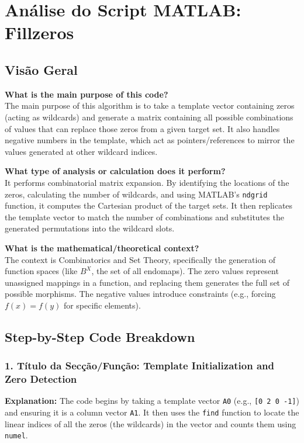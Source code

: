 \chapter{Análise do Script MATLAB: Fillzeros}
\section{Visão Geral}

\textbf{What is the main purpose of this code?} \\
The main purpose of this algorithm is to take a template vector containing zeros (acting as wildcards) and generate a matrix containing all possible combinations of values that can replace those zeros from a given target set. It also handles negative numbers in the template, which act as pointers/references to mirror the values generated at other wildcard indices.

\textbf{What type of analysis or calculation does it perform?} \\
It performs combinatorial matrix expansion. By identifying the locations of the zeros, calculating the number of wildcards, and using MATLAB's \texttt{ndgrid} function, it computes the Cartesian product of the target sets. It then replicates the template vector to match the number of combinations and substitutes the generated permutations into the wildcard slots. 

\textbf{What is the mathematical/theoretical context?} \\
The context is Combinatorics and Set Theory, specifically the generation of function spaces (like $B^X$, the set of all endomaps). The zero values represent unassigned mappings in a function, and replacing them generates the full set of possible morphisms. The negative values introduce constraints (e.g., forcing $f(x) = f(y)$ for specific elements).

\newpage
\section{Step-by-Step Code Breakdown}

\subsection{1. Título da Secção/Função: Template Initialization and Zero Detection}
\textbf{Explanation:} 
The code begins by taking a template vector \texttt{A0} (e.g., \texttt{[0 2 0 -1]}) and ensuring it is a column vector \texttt{A1}. It then uses the \texttt{find} function to locate the linear indices of all the zeros (the wildcards) in the vector and counts them using \texttt{numel}.

